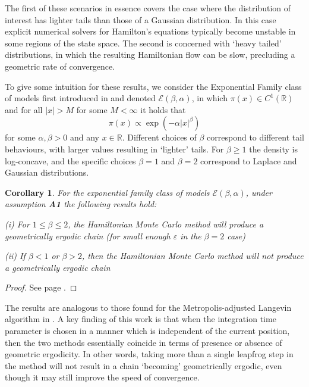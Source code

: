 \documentclass[bj,numbers,noshowframe]{imsart}
\newcommand{\R}{\mathbb{R}}
\newcommand{\e}{\varepsilon}
\theoremstyle{definition}
\theoremstyle{plain}
\newtheorem{crly}[defn]{Corollary}
\theoremstyle{definition}
\begin{document}
The first of these scenarios in essence covers the case where the distribution of interest has lighter tails than those of a Gaussian distribution.  In this case explicit numerical solvers for Hamilton's equations typically become unstable in some regions of the state space.  The second is concerned with `heavy tailed' distributions, in which the resulting Hamiltonian flow can be slow, precluding a geometric rate of convergence.

To give some intuition for these results, we consider the Exponential Family class of models first introduced in \citep{roberts1996exponential} and denoted $\mathcal{E}(\beta,\alpha)$, in which $\pi(x) \in C^1(\R)$ and for all $|x|>M$ for some $M<\infty$ it holds that
\[
\pi(x) \propto \exp \left( -\alpha|x|^{\beta} \right)
\]
for some $\alpha,\beta > 0$ and any $x \in \R$.  Different choices of $\beta$ correspond to different tail behaviours, with larger values resulting in `lighter' tails.  For $\beta \geq 1$ the density is log-concave, and the specific choices $\beta = 1$ and $\beta = 2$ correspond to Laplace and Gaussian distributions.

\begin{crly} \label{crly:expfam}
For the exponential family class of models $\mathcal{E}(\beta,\alpha)$, under assumption \textbf{A1} the following results hold:

\vspace{0.2cm}

(i) For $1 \leq \beta \leq 2$, the Hamiltonian Monte Carlo method will produce a geometrically ergodic chain (for small enough $\e$ in the $\beta = 2$ case)

\vspace{0.2cm}

(ii) If $\beta < 1$ or $\beta > 2$, then the Hamiltonian Monte Carlo method will \emph{not} produce a geometrically ergodic chain
\end{crly}

\begin{proof}
See page \pageref{proof:expfam}.
\end{proof}

The results are analogous to those found for the Metropolis-adjusted Langevin algorithm in \citep{roberts1996exponential}.  A key finding of this work is that when the integration time parameter is chosen in a manner which is independent of the current position, then the two methods essentially coincide in terms of presence or absence of geometric ergodicity.  In other words, taking more than a single leapfrog step in the method will not result in a chain `becoming' geometrically ergodic, even though it may still improve the speed of convergence.
\end{document}
